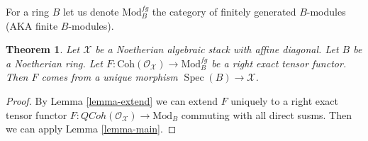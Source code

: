 \documentclass{stacks-project}
\theoremstyle{plain}
\newtheorem{theorem}[subsection]{Theorem}
\theoremstyle{definition}
\theoremstyle{remark}
\numberwithin{equation}{subsection}
\def\Spec{\mathop{\mathrm{Spec}}}
\def\QCoh{\mathit{QCoh}}
\begin{document}
\noindent
For a ring $B$ let us denote $\text{Mod}^{fg}_B$ the category of
finitely generated $B$-modules (AKA finite $B$-modules).

\begin{theorem}
\label{theorem-main}
Let $\mathcal{X}$ be a Noetherian algebraic stack with affine diagonal.
Let $B$ be a Noetherian ring.
Let $F : \text{Coh}(\mathcal{O}_\mathcal{X}) \to \text{Mod}^{fg}_B$
be a right exact tensor functor.
Then $F$ comes from a unique morphism $\Spec(B) \to \mathcal{X}$.
\end{theorem}

\begin{proof}
By Lemma \ref{lemma-extend}
we can extend $F$ uniquely to a right exact tensor functor
$F : \QCoh(\mathcal{O}_\mathcal{X}) \to \text{Mod}_B$
commuting with all direct susms. Then we can apply
Lemma \ref{lemma-main}.
\end{proof}














\end{document}
